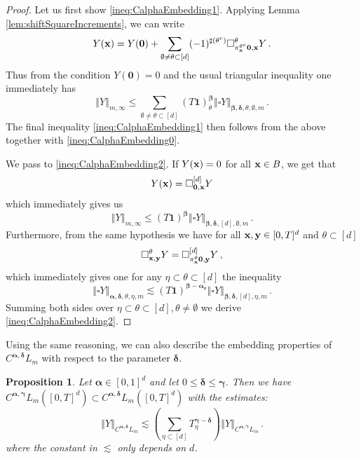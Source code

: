 \documentclass[12pt]{article}
\numberwithin{equation}{section}
\theoremstyle{plain}
\newtheorem{proposition}[theorem]{Proposition}
\theoremstyle{definition}
\newcommand{\norm}[1]{\left\Vert #1\right\Vert}
\def\fy{\mathbf y}\def\fz{\mathbf z}
\def\falpha{{\boldsymbol\alpha}}
\def\fbeta{{\boldsymbol\beta}}
\def\fgamma{{\boldsymbol\gamma}}
\def\fdelta{{\boldsymbol\delta}}
\def\foo{{\boldsymbol 0}}
\def\fone{{\boldsymbol 1}}
\begin{document}
\begin{proof}
    Let us first show \eqref{ineq:CalphaEmbedding1}. Applying  Lemma \ref{lem:shiftSquareIncrements}, we can write
    \begin{equation*}
        Y(\fx) = Y(\foo) + \sum_{\emptyset\neq\theta\subset[d]} (-1)^{\sharp(\theta^c)}\square^{\theta}_{\pi_\fx^{\theta^c} \foo,\fx} Y\,. 
    \end{equation*}
    Thus from the condition $Y(\foo) = 0$ and the usual triangular inequality  one immediately has 
    \begin{equation*}
        \norm{Y}_{m,\infty}\le \sum_{\emptyset\neq\theta\subset[d]} (T\fone)^{\fbeta}_{\theta}\norm{\square Y}_{\fbeta,\fdelta,\theta,\emptyset,m} \,.
    \end{equation*}
    The final inequality \eqref{ineq:CalphaEmbedding1} then follows from the above together with \eqref{ineq:CalphaEmbedding0}.

  We pass to \eqref{ineq:CalphaEmbedding2}. If $Y(\mathbf x) = 0$ for all $\mathbf x\in B$, we get that
    \begin{equation*}
        Y(\fx) = \square_{\foo,\fx}^{[d]} Y
    \end{equation*}
    which immediately gives us
    \begin{equation*}
        \norm{Y}_{m,\infty}\le (T\fone)^{\fbeta}\norm{\square Y}_{\fbeta,\fdelta,[d],\emptyset,m} \,.
    \end{equation*}
    Furthermore, from the same hypothesis we have for all $\fx,\fy\in[0,T]^d$ and $\theta\subset[d]$
    \begin{equation*}
        \square_{\fx,\fy}^\theta Y = \square^{[d]}_{\pi^\theta_\fx \foo,\fy} Y\,,
    \end{equation*}
    which immediately gives one for any $\eta\subset\theta\subset[d]$ the inequality
    \begin{equation*}
        \norm{\square Y}_{\falpha,\fdelta,\theta,\eta,m} \lesssim (T\fone)^{\fbeta-\falpha_{\theta}}\norm{\square Y}_{\fbeta,\fdelta,[d],\eta,m} \,.
    \end{equation*}
    Summing both sides over $\eta\subset\theta\subset[d],\theta\neq\emptyset$ we derive \eqref{ineq:CalphaEmbedding2}.
\end{proof}
Using the same reasoning, we can also describe the embedding properties of $C^{\falpha,\fdelta}L_m  
$ with respect to the parameter $\fdelta$.
\begin{proposition}\label{prop:CalphaEmbedding2}
    Let $\falpha\in[0,1]^d$ and let $0\le\fdelta\le\fgamma$. Then we have $C^{\falpha,\fgamma} L_m([0,T]^d)\subset C^{\falpha,\fdelta} L_m([0,T]^d)$ with the estimates:
    \begin{equation*}
        \norm{Y}_{C^{\falpha,\fdelta}L_m} \lesssim \left(\sum_{\eta\subset[d]} T_\eta^{\fgamma-\fdelta}\right) \norm{Y}_{C^{\falpha,\fgamma}L_m}\,.
    \end{equation*}
    where the constant in $\lesssim$ only depends on $d$.
\end{proposition}
\end{document}
